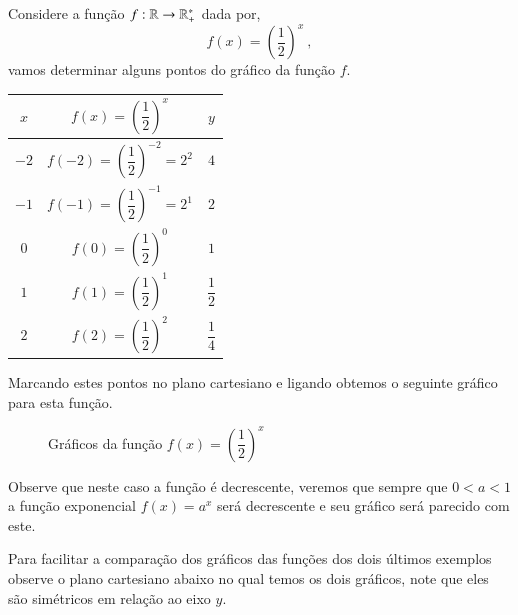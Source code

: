 
  \begin{exem}\label{ex:exp-1/2}
  Considere a função $f: \mathbb{R} \rightarrow \mathbb{R}_{+}^{*} $ dada por, 
  \[f(x) = \left(\dfrac{1}{2}\right)^x \ , \]
  vamos determinar alguns pontos do gráfico da função $f$.
 
  \begin{table}[H]
  \centering
  \begin{tabular}{|c|c|c|} \hline
  \rowcolor{cinza}
  $x$ & $f(x) = \left(\dfrac{1}{2}\right)^x$ & $y$ \\ \hline
  $-2$ & $f(-2)= \left(\dfrac{1}{2}\right)^{-2}= 2^2$ & $4$ \\ \hline
  $-1$ & $f(-1)= \left(\dfrac{1}{2}\right)^{-1}= 2^1$ & $2$ \\ \hline
  $0$ & $f(0)= \left(\dfrac{1}{2}\right)^{0}$ & $1$ \\ \hline
  $1$ & $f(1)= \left(\dfrac{1}{2}\right)^{1}$ & $\dfrac{1}{2}$ \\ \hline
  $2$ & $f(2)= \left(\dfrac{1}{2}\right)^{2}$ & $\dfrac{1}{4}$ \\ \hline
  \end{tabular}
  \end{table}
  
  Marcando estes pontos no plano cartesiano e ligando obtemos o seguinte gráfico para esta função.
  
  \begin{figure}[H]
  \centering
    \caption{Gráficos da função $f(x)=\left(\dfrac{1}{2}\right)^x$}
  \end{figure}
  
  Observe que neste caso a função é decrescente, veremos que sempre que $0< a < 1$ a função exponencial $f(x)=a^x$ será decrescente e seu gráfico será parecido com este.
 
 \end{exem}
 
 Para facilitar a comparação dos gráficos das funções dos dois últimos exemplos observe o plano cartesiano abaixo no qual temos os dois gráficos, note que eles são simétricos em relação ao eixo $y$.
 
